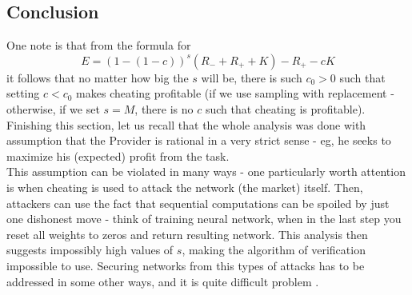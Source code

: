 \documentclass{winnower}
\begin{document}
\subsection{Conclusion}
One note is that from the formula for $$E = (1 - (1 - c))^s(R_{-} + R_{+} + K) - R_{+} - cK$$ it follows that no matter how big the $s$ will be, there is such $c_0 > 0$ such that setting $c < c_0$ makes cheating profitable (if we use sampling with replacement - otherwise, if we set $s=M$, there is no $c$ such that cheating is profitable). \\
Finishing this section, let us recall that the whole analysis was done with assumption that the Provider is rational in a very strict sense - eg, he seeks to maximize his (expected) profit from the task. \\
This assumption can be violated in many ways - one particularly worth attention is when cheating is used to attack the network (the market) itself. Then, attackers can use the fact that sequential computations can be spoiled by just one dishonest move - think of training neural network, when in the last step you reset all weights to zeros and return resulting network. This analysis then suggests impossibly high values of $s$, making the algorithm of verification impossible to use.
Securing networks from this types of attacks has to be addressed in some other ways, and it is quite difficult problem \citep{truebit}.
\end{document}
